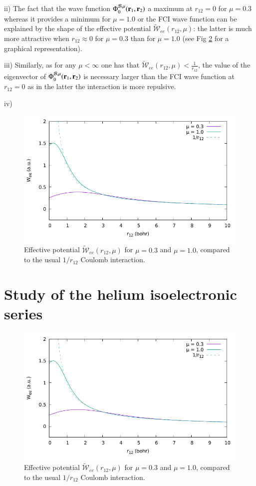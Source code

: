 \documentclass[aip,jcp,reprint,noshowkeys,superscriptaddress]{revtex4-1}
\newcommand{\br}[0]{{\bf {r}}}
\newcommand{\phimub}[0]{\Phi^{\mathcal{B},\mu}_0}
\begin{document}
ii) The fact that the wave function $\phimub(\br{}_1,\br{}_2)$ a maximum at $r_{12}=0$ for $\mu=0.3$ whereas it provides a minimum for $\mu=1.0$ or the FCI wave function can be explained by the shape of the effective potential $\tilde{\mathcal{W}}_{ee}(r_{12},\mu)$: the latter is much more attractive when $r_{12}\approx 0$ for $\mu=0.3$ than for $\mu = 1.0$ (see Fig \ref{fig_wee_compare} for a graphical representation). 

iii) Similarly, as for any $\mu < \infty$ one has that $\tilde{\mathcal{W}}_{ee}(r_{12},\mu) <\frac{1}{r_{12}}$, the value of the eigenvector of $\phimub(\br{}_1,\br{}_2)$ is necessary larger than the FCI wave function at $r_{12}=0$ as in the latter the interaction is more repulsive. 

iv) 
\begin{figure}
 \label{fig_wee_compare}
        \includegraphics[width=1.00\linewidth]{w_ee_compare.pdf}
        \caption{
        Effective potential $\tilde{\mathcal{W}}_{ee}(r_{12},\mu)$ for $\mu=0.3$ and $\mu=1.0$, compared to the usual $1/r_{12}$ Coulomb interaction.}
\end{figure}

\section{Study of the helium isoelectronic series}
\begin{figure}
 \label{fig_wee_compare}
        \includegraphics[width=1.00\linewidth]{w_ee_compare.pdf}
        \caption{
        Effective potential $\tilde{\mathcal{W}}_{ee}(r_{12},\mu)$ for $\mu=0.3$ and $\mu=1.0$, compared to the usual $1/r_{12}$ Coulomb interaction.}
\end{figure}
\end{document}
